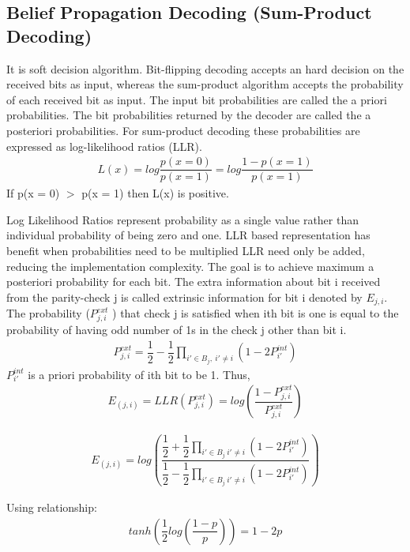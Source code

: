 \subsection{Belief Propagation Decoding (Sum-Product Decoding)} 


It is soft decision algorithm.
Bit-flipping decoding accepts an hard decision on
the received bits as input, whereas the sum-product algorithm accepts the probability of each received bit as input.
The input bit probabilities are called the a priori probabilities.
The bit probabilities returned by the decoder are called the a posteriori probabilities.
For sum-product decoding these probabilities are expressed
as log-likelihood ratios (LLR).
\begin{align} L(x)=log\dfrac{p(x=0)}{p(x=1)}=log\dfrac{1-p(x=1)}{p(x=1)} \end{align}
 If p(x = 0) $>$ p(x = 1) then L(x) is positive.

Log Likelihood Ratios represent probability as a single value rather than individual probability of being zero and one.
LLR based representation has benefit when probabilities
need to be multiplied LLR need only be added, reducing the implementation complexity.\cite{9}
The goal is to achieve maximum a posteriori probability for each bit. 
The extra information about bit i received
from the parity-check j is called extrinsic information for bit i denoted by $E_{j,i}$. The probability ($P_{j,i}^{ext}$ ) that check j is satisfied when ith bit is one is equal to the probability of having odd number of 1s in the check j other than bit i.
\begin{align} P_{j,i}^{ext} = \dfrac{1}{2}-\dfrac{1}{2} \prod_{i'\in B_j, \ i'\neq i }(1-2P_{i'}^{int})  \end{align}
$P_{i'}^{int}$ is a priori probability of ith bit to be 1. Thus,
\begin{align}
 E_{(j,i)} =  LLR (P_{j,i}^{ext}) = log \left(
\dfrac{1-P_{j,i}^{ext}}{P_{j,i}^{ext}} 
\right)
\end{align}

\begin{align} E_{(j,i)} = log
\left(
\dfrac{\dfrac{1}{2}+\dfrac{1}{2} \prod_{i'\in B_j \ i'\neq i }(1-2P_{i'}^{int}) }{\dfrac{1}{2}-\dfrac{1}{2} \prod_{i'\in B_j \ i'\neq i }(1-2P_{i'}^{int}) } 
\right)
\end{align}

Using relationship: \begin{align}tanh \left(  \dfrac{1}{2}log \left( \dfrac{1-p}{p} \right) \right)=1-2p 
\end{align}

